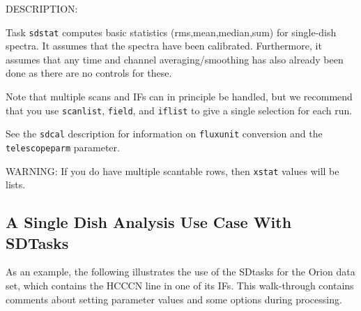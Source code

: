     DESCRIPTION:

     Task {\tt sdstat} computes basic statistics (rms,mean,median,sum)
     for single-dish spectra.  It assumes that the spectra have
     been calibrated.  Furthermore, it assumes that any
     time and channel averaging/smoothing has also already been done as
     there are no controls for these. 

     Note that multiple scans and IFs can in principle be handled, but
     we recommend that you use {\tt scanlist}, {\tt field}, and {\tt iflist} to give a
     single selection for each run.

     See the {\tt sdcal} description for information on {\tt fluxunit} 
     conversion and the {\tt telescopeparm} parameter.

     WARNING: If you do have multiple scantable rows, then {\tt xstat}
     values will be lists.

\subsection{A Single Dish Analysis Use Case With SDTasks}
\label{section:sd.sdtasks.usecase}

As an example, the following illustrates the use of the SDtasks for
the Orion data set, which contains the HCCCN line in one of its IFs.
This walk-through contains comments about setting parameter values
and some options during processing.


